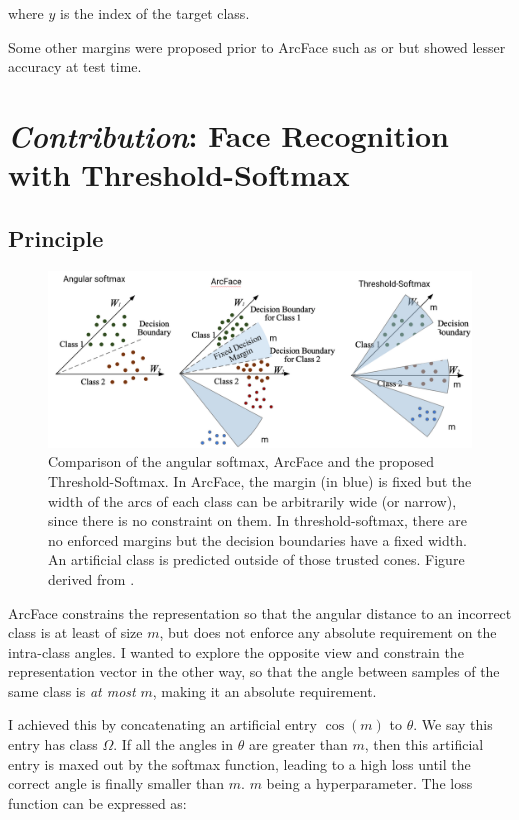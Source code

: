 where $y$ is the index of the target class.

Some other margins were proposed prior to ArcFace such as \citep{sphereface} or \citep{cosface} but showed lesser accuracy at test time.

\section{\arr \emph{Contribution}: Face Recognition with Threshold-Softmax}
\label{sec:tsm}
\subsection{Principle}

\begin{figure}
    \centering
    \includegraphics[width=\columnwidth]{50-files/download.png}
    \caption{Comparison of the angular softmax, ArcFace and the proposed Threshold-Softmax. In ArcFace, the margin (in blue) is fixed but the width of the arcs of each class can be arbitrarily wide (or narrow), since there is no constraint on them. In threshold-softmax, there are no enforced margins but the decision boundaries have a fixed width. An artificial class is predicted outside of those trusted cones. Figure derived from \cite{amsoftmax}.}
    \label{fig:tsm}
\end{figure}

ArcFace constrains the representation so that the angular distance to an incorrect class is at least of size $m$, but does not enforce any absolute requirement on the intra-class angles. I wanted to explore the opposite view and constrain the representation vector in the other way, so that the angle between samples of the same class is \emph{at most} $m$, making it an absolute requirement.

I achieved this by concatenating an artificial entry $\cos(m)$ to $\theta$. We say this entry has class $\Omega$. If all the angles in $\theta$ are greater than $m$, then this artificial entry is maxed out by the softmax function, leading to a high loss until the correct angle is finally smaller than $m$. $m$ being a hyperparameter. The loss function can be expressed as:


